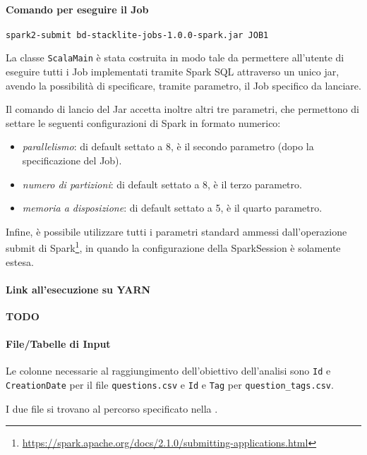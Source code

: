   \paragraph{Comando per eseguire il Job}\label{par:job1:spark:cmd}

  \texttt{spark2-submit bd-stacklite-jobs-1.0.0-spark.jar JOB1}

  La classe \texttt{ScalaMain} è stata costruita in modo tale da permettere all'utente di eseguire tutti i Job implementati tramite
  Spark SQL attraverso un unico jar, avendo la possibilità di specificare, tramite parametro, il Job specifico da lanciare.

  Il comando di lancio del Jar accetta inoltre altri tre parametri, che permettono di settare le seguenti configurazioni di Spark in formato numerico:
  \begin{itemize}
    \item \textit{parallelismo}: di default settato a 8, è il secondo parametro (dopo la specificazione del Job).
    \item \textit{numero di partizioni}: di default settato a 8, è il terzo parametro.
    \item \textit{memoria a disposizione}: di default settato a 5, è il quarto parametro.
  \end{itemize}

  Infine, è possibile utilizzare tutti i parametri standard ammessi dall'operazione submit di Spark\footnote{\url{https://spark.apache.org/docs/2.1.0/submitting-applications.html}},
  in quando la configurazione della SparkSession è solamente estesa.

  \paragraph{Link all'esecuzione su YARN}\label{par:job1:spark:yarn}

  \textbf{TODO}

  \paragraph{File/Tabelle di Input}\label{par:job1:spark:input}

  Le colonne necessarie al raggiungimento dell'obiettivo dell'analisi sono \texttt{Id} e \texttt{CreationDate} per il file \texttt{questions.csv}
  e \texttt{Id} e \texttt{Tag} per \texttt{question\_tags.csv}.

  I due file si trovano al percorso specificato nella .

